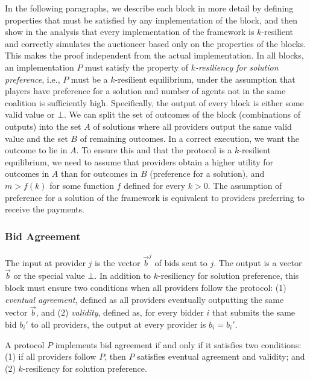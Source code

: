 In the following paragraphs, we describe each block 
in more detail by defining properties that must be satisfied 
by any implementation of the block, and then show in the analysis that
every implementation of the framework is $k$-resilient and correctly simulates
the auctioneer based only on the properties of the blocks. This makes
the proof independent from the actual implementation.
In all blocks, an implementation $P$ must satisfy
the property of \emph{$k$-resiliency for solution preference}, i.e.,
$P$ must be a $k$-resilient equilibrium, under
the assumption that players have preference for a solution 
and number of agents not in the same coalition is sufficiently high.
Specifically, the output of every block is either some valid value or $\bot$.
We can split the set of outcomes of the block (combinations of outputs)
into the set $A$ of solutions where all providers output the same valid value
and the set $B$ of remaining outcomes. 
In a correct execution, we want the outcome to lie in $A$.
To ensure this and that the protocol is a $k$-resilient equilibrium,
we need to assume that providers obtain a higher utility for outcomes in $A$
than for outcomes in $B$ (preference for a solution), and $m > f(k)$ for
some function $f$ defined for every $k > 0$.
The assumption of preference for a solution of the framework
is equivalent to providers preferring to receive the payments.

\subsubsection{Bid Agreement}
The input at provider $j$ is the vector $\vec{b}^j$ of bids sent to $j$.
The output is a vector $\vec{b}$ or the special value $\bot$.
In addition to $k$-resiliency for solution preference,
this block must ensure two conditions when all providers follow the protocol: 
(1) \emph{eventual agreement}, defined as
all providers eventually outputting the same vector $\vec{b}$,
and (2) \emph{validity}, defined as,
for every bidder $i$ that submits the same bid $b_i'$
to all providers, the output at every provider is $b_i = b_i'$.

\begin{property}
\label{prop:bid-agreement}
A protocol $P$ implements bid agreement if and only if it satisfies two conditions:
(1) if all providers follow $P$, then $P$ satisfies eventual agreement and validity;
and (2) $k$-resiliency for solution preference.
\end{property}


